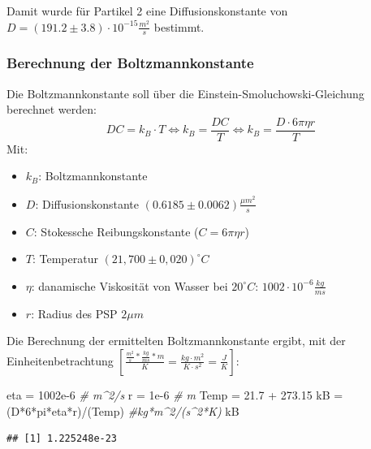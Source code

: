 \documentclass[
  9pt,
]{article}
\newenvironment{Shaded}{\begin{snugshade}}{\end{snugshade}}
\newcommand{\CommentTok}[1]{\textcolor[rgb]{0.56,0.35,0.01}{\textit{#1}}}
\newcommand{\DecValTok}[1]{\textcolor[rgb]{0.00,0.00,0.81}{#1}}
\newcommand{\FloatTok}[1]{\textcolor[rgb]{0.00,0.00,0.81}{#1}}
\newcommand{\NormalTok}[1]{#1}
\newcommand{\OtherTok}[1]{\textcolor[rgb]{0.56,0.35,0.01}{#1}}
\newcommand{\SpecialCharTok}[1]{\textcolor[rgb]{0.00,0.00,0.00}{#1}}
\begin{document}
Damit wurde für Partikel 2 eine Diffusionskonstante von
\(D=(191.2 \pm 3.8)\cdot 10^{-15} \frac{m^2}{s}\) bestimmt.

\hypertarget{berechnung-der-boltzmannkonstante}{%
\subsubsection{Berechnung der
Boltzmannkonstante}\label{berechnung-der-boltzmannkonstante}}

Die Boltzmannkonstante soll über die Einstein-Smoluchowski-Gleichung
berechnet werden:
\[DC = k_B\cdot T \Leftrightarrow k_B = \frac{DC}{T} \Leftrightarrow k_B = \frac{D\cdot 6\pi \eta r}{T}\]
Mit:

\begin{itemize}
  \item $k_B$: Boltzmannkonstante
  \item $D$: Diffusionskonstante $(0.6185 \pm 0.0062 )\frac{\mu m^2}{s}$
  \item $C$: Stokessche Reibungskonstante ($C=6\pi \eta r$)
  \item $T$: Temperatur $(21,700 \pm 0,020)^{\circ}C$
  \item $\eta$: danamische Viskosität von Wasser bei $20^{\circ}C$: $1002\cdot 10^{-6} \frac{kg}{ms}$
  \item $r$: Radius des PSP $2\mu m$
\end{itemize}

Die Berechnung der ermittelten Boltzmannkonstante ergibt, mit der
Einheitenbetrachtung
\([\frac{\frac{m^2}{s}*\frac{kg}{ms}*m}{K} = \frac{kg\cdot m^2}{K\cdot s^2}= \frac{J}{K}]\):

\begin{Shaded}
\begin{Highlighting}[]
\NormalTok{eta }\OtherTok{=} \FloatTok{1002e{-}6} \CommentTok{\# m\^{}2/s}
\NormalTok{r }\OtherTok{=} \FloatTok{1e{-}6} \CommentTok{\# m }
\NormalTok{Temp }\OtherTok{=} \FloatTok{21.7} \SpecialCharTok{+} \FloatTok{273.15}
\NormalTok{kB }\OtherTok{=}\NormalTok{ (D}\SpecialCharTok{*}\DecValTok{6}\SpecialCharTok{*}\NormalTok{pi}\SpecialCharTok{*}\NormalTok{eta}\SpecialCharTok{*}\NormalTok{r)}\SpecialCharTok{/}\NormalTok{(Temp) }\CommentTok{\#kg*m\^{}2/(s\^{}2*K)}
\NormalTok{kB}
\end{Highlighting}
\end{Shaded}

\begin{verbatim}
## [1] 1.225248e-23
\end{verbatim}
\end{document}
